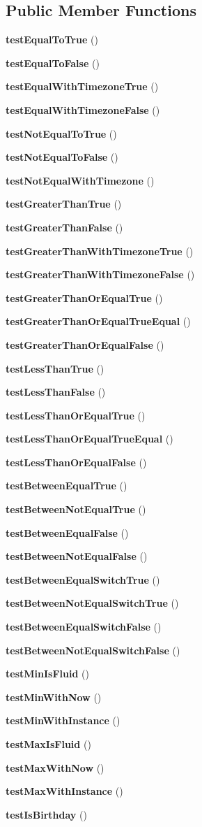 \subsection*{Public Member Functions}
\begin{DoxyCompactItemize}
\item 
{\bf test\+Equal\+To\+True} ()
\item 
{\bf test\+Equal\+To\+False} ()
\item 
{\bf test\+Equal\+With\+Timezone\+True} ()
\item 
{\bf test\+Equal\+With\+Timezone\+False} ()
\item 
{\bf test\+Not\+Equal\+To\+True} ()
\item 
{\bf test\+Not\+Equal\+To\+False} ()
\item 
{\bf test\+Not\+Equal\+With\+Timezone} ()
\item 
{\bf test\+Greater\+Than\+True} ()
\item 
{\bf test\+Greater\+Than\+False} ()
\item 
{\bf test\+Greater\+Than\+With\+Timezone\+True} ()
\item 
{\bf test\+Greater\+Than\+With\+Timezone\+False} ()
\item 
{\bf test\+Greater\+Than\+Or\+Equal\+True} ()
\item 
{\bf test\+Greater\+Than\+Or\+Equal\+True\+Equal} ()
\item 
{\bf test\+Greater\+Than\+Or\+Equal\+False} ()
\item 
{\bf test\+Less\+Than\+True} ()
\item 
{\bf test\+Less\+Than\+False} ()
\item 
{\bf test\+Less\+Than\+Or\+Equal\+True} ()
\item 
{\bf test\+Less\+Than\+Or\+Equal\+True\+Equal} ()
\item 
{\bf test\+Less\+Than\+Or\+Equal\+False} ()
\item 
{\bf test\+Between\+Equal\+True} ()
\item 
{\bf test\+Between\+Not\+Equal\+True} ()
\item 
{\bf test\+Between\+Equal\+False} ()
\item 
{\bf test\+Between\+Not\+Equal\+False} ()
\item 
{\bf test\+Between\+Equal\+Switch\+True} ()
\item 
{\bf test\+Between\+Not\+Equal\+Switch\+True} ()
\item 
{\bf test\+Between\+Equal\+Switch\+False} ()
\item 
{\bf test\+Between\+Not\+Equal\+Switch\+False} ()
\item 
{\bf test\+Min\+Is\+Fluid} ()
\item 
{\bf test\+Min\+With\+Now} ()
\item 
{\bf test\+Min\+With\+Instance} ()
\item 
{\bf test\+Max\+Is\+Fluid} ()
\item 
{\bf test\+Max\+With\+Now} ()
\item 
{\bf test\+Max\+With\+Instance} ()
\item 
{\bf test\+Is\+Birthday} ()
\end{DoxyCompactItemize}
